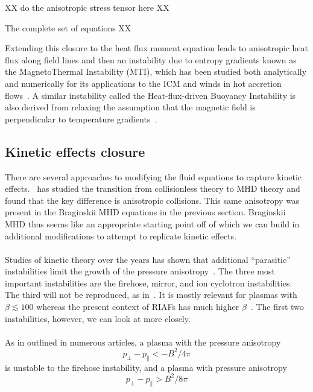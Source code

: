 XX do the anisotropic stress tensor here XX


The complete set of equations XX


Extending this closure to the heat flux moment equation leads to anisotropic heat flux along field lines and then an instability due to entropy gradients known as the MagnetoThermal Instability (MTI), which has been studied both analytically and numerically for its applications to the ICM and winds in hot accretion flows~\cite{KunzBraginskii,Balbus2000,Balbus2001,Kunz2011,Parrish2007,Parrish2005,Johnson2007,Bu2016}. A similar instability called the Heat-flux-driven Buoyancy Instability is also derived from relaxing the assumption that the magnetic field is perpendicular to temperature gradients~\cite{Quataert2008,Parrish2008a,Kunz2011}.

\subsection{Kinetic effects closure}\label{ssec:kinclosure}
There are several approaches to modifying the fluid equations to capture kinetic effects.~\citet{Sharma2003} has studied the transition from collisionless theory to MHD theory and found that the key difference is anisotropic collisions. This same anisotropy was present in the Braginskii MHD equations in the previous section. Braginskii MHD thus seems like an appropriate starting point off of which we can build in additional modifications to attempt to replicate kinetic effects.\\
\\
Studies of kinetic theory over the years has shown that additional ``parasitic'' instabilities limit the growth of the pressure anisotropy~\cite{Sharma2008, Kunz2016}. The three most important instabilities are the firehose, mirror, and ion cyclotron instabilities. The third will not be reproduced, as in~\citet{Sharma2008}. It is mostly relevant for plasmas with $\beta\lesssim100$ whereas the present context of RIAFs has much higher $\beta$~\cite{Sharma2007}. The first two instabilities, however, we can look at more closely. \\
\\
As in outlined in numerous articles, a plasma with the pressure anisotropy
\begin{equation}
  p_\perp-p_\parallel<-B^2/4\pi\label{eq:fhthresh}
\end{equation}
is unstable to the firehose instability, and a plasma with pressure anisotropy
\begin{equation}
  p_\perp-p_\parallel >B^2/8\pi \label{eq:mirrorthresh}
\end{equation}
